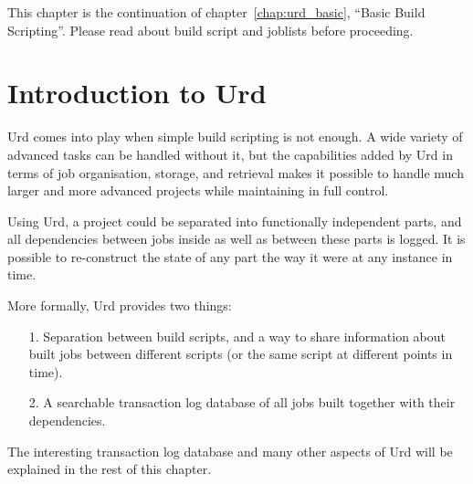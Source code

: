 
\label{chap:urd}

This chapter is the continuation of chapter~\ref{chap:urd_basic},
``Basic Build Scripting''.  Please read about build script and
joblists before proceeding.


\section{Introduction to Urd}

Urd comes into play when simple build scripting is not enough.  A wide
variety of advanced tasks can be handled without it, but the
capabilities added by Urd in terms of job organisation, storage, and
retrieval makes it possible to handle much larger and more advanced
projects while maintaining in full control.

Using Urd, a project could be separated into functionally independent
parts, and all dependencies between jobs inside as well as between
these parts is logged.  It is possible to re-construct the state of
any part the way it were at any instance in time.

More formally, Urd provides two things:
\begin{itemize}
\item[1.] Separation between build scripts,
        and a way to share information about built jobs between
        different scripts (or the same script at different points in time).
\item[2.] A searchable transaction log database of all jobs built
together with their dependencies.
\end{itemize}
The interesting transaction log database and many other aspects of Urd
will be explained in the rest of this chapter.





